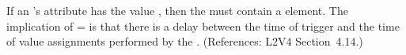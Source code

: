 If an \Event's  attribute has the value
, then the \Event must contain a \Delay element.  The
implication of = is that there
is a delay between the time of trigger and the time of value assignments
performed by the \Event.  (References: L2V4 Section~4.14.)
